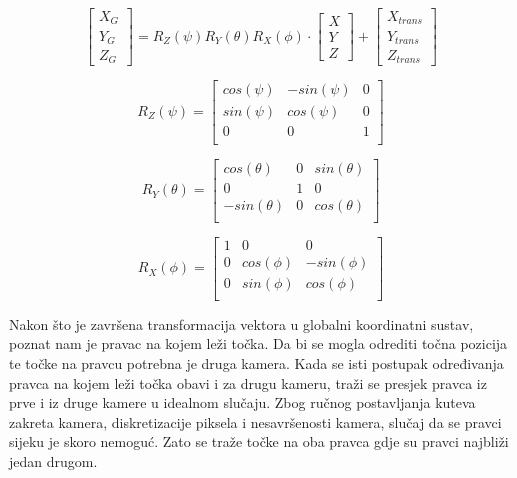 \documentclass[times, utf8, diplomski]{fer}
\begin{document}
\begin{equation}
	\begin{bmatrix}
		X_G \\
		Y_G \\
		Z_G
	\end{bmatrix}
	= R_{Z}(\psi)R_{Y}(\theta)R_{X}(\phi)\cdot
	\begin{bmatrix}
		X \\
		Y \\
		Z 
	\end{bmatrix}
	+ \begin{bmatrix}
		X_{trans} \\
		Y_{trans} \\
		Z_{trans} 
	\end{bmatrix}
\end{equation}

\begin{equation}
	R_{Z}(\psi) = 
	\begin{bmatrix}
		cos(\psi) & -sin(\psi) & 0 \\
		sin(\psi) & cos(\psi) & 0 \\
		0 & 0 & 1 \\
	\end{bmatrix}
\end{equation}

\begin{equation}
	R_{Y}(\theta) = 
	\begin{bmatrix}
		cos(\theta) & 0 & sin(\theta) \\
		0 & 1 & 0 \\
		-sin(\theta) & 0 & cos(\theta) \\
	\end{bmatrix}
\end{equation}

\begin{equation}
	R_{X}(\phi) = 
	\begin{bmatrix}
		1 & 0 & 0 \\
		0 & cos(\phi) & -sin(\phi) \\
		0 & sin(\phi) & cos(\phi) \\
	\end{bmatrix}
\end{equation}

\vspace{5mm}

Nakon što je završena transformacija vektora u globalni koordinatni sustav, poznat nam je pravac na kojem leži točka. Da bi se mogla odrediti točna pozicija te točke na pravcu potrebna je druga kamera. Kada se isti postupak određivanja pravca na kojem leži točka obavi i za drugu kameru, traži se presjek pravca iz prve i iz druge kamere u idealnom slučaju. Zbog ručnog postavljanja kuteva zakreta kamera, diskretizacije piksela i nesavršenosti kamera, slučaj da se pravci sijeku je skoro nemoguć. Zato se traže točke na oba pravca gdje su pravci najbliži jedan drugom.
\end{document}
